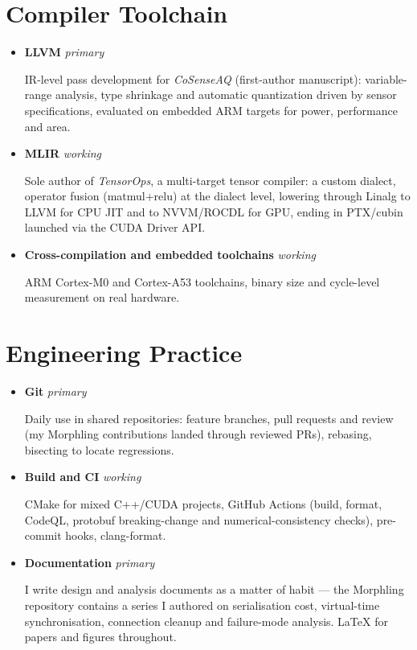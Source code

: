\documentclass[letterpaper,11pt]{article}
\newcommand{\tool}[3]{%
  \item\small{\textbf{#1} \hfill \textit{\footnotesize #2}\par\vspace{1pt}#3\vspace{2pt}}
}
\begin{document}
\section{Compiler Toolchain}
  \begin{itemize}[leftmargin=*]
    \tool{LLVM}{primary}
      {IR-level pass development for \textit{CoSenseAQ} (first-author manuscript): variable-range analysis, type shrinkage and automatic quantization driven by sensor specifications, evaluated on embedded ARM targets for power, performance and area.}
    \tool{MLIR}{working}
      {Sole author of \textit{TensorOps}, a multi-target tensor compiler: a custom dialect, operator fusion (matmul+relu) at the dialect level, lowering through Linalg to LLVM for CPU JIT and to NVVM/ROCDL for GPU, ending in PTX/cubin launched via the CUDA Driver API.}
    \tool{Cross-compilation and embedded toolchains}{working}
      {ARM Cortex-M0 and Cortex-A53 toolchains, binary size and cycle-level measurement on real hardware.}
  \end{itemize}

\section{Engineering Practice}
  \begin{itemize}[leftmargin=*]
    \tool{Git}{primary}
      {Daily use in shared repositories: feature branches, pull requests and review (my Morphling contributions landed through reviewed PRs), rebasing, bisecting to locate regressions.}
    \tool{Build and CI}{working}
      {CMake for mixed C++/CUDA projects, GitHub Actions (build, format, CodeQL, protobuf breaking-change and numerical-consistency checks), pre-commit hooks, clang-format.}
    \tool{Documentation}{primary}
      {I write design and analysis documents as a matter of habit --- the Morphling repository contains a series I authored on serialisation cost, virtual-time synchronisation, connection cleanup and failure-mode analysis. LaTeX for papers and figures throughout.}
  \end{itemize}
\end{document}
